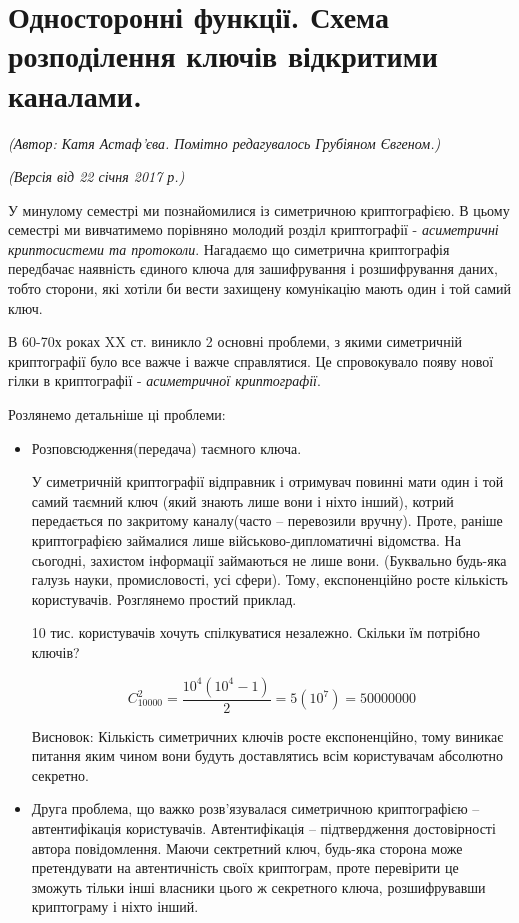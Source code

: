 \section{Односторонні функції. Схема розподілення ключів відкритими каналами.}
\begin{flushright}
\emph{(Автор: Катя Астаф'єва. Помітно редагувалось Грубіяном Євгеном.)}
\par \emph{(Версія від 22 січня 2017 р.)}
\end{flushright}

У минулому семестрі ми познайомилися із симетричною криптографією. В цьому семестрі ми вивчатимемо порівняно молодий розділ криптографії - \textit{асиметричні криптосистеми та протоколи}. Нагадаємо що симетрична криптографія передбачає наявність єдиного ключа для зашифрування і розшифрування даних, тобто сторони, які хотіли би вести захищену комунікацію мають один і той самий ключ.

В 60-70х роках XX ст. виникло 2 основні проблеми, з якими симетричній криптографії було все важче і важче справлятися. Це спровокувало появу нової гілки в криптографії - \textit{асиметричної криптографії}. 

Розлянемо детальніше ці проблеми:
\begin{itemize}
\item Розповсюдження(передача) таємного ключа.

У симетричній криптографії відправник і отримувач повинні мати один і той самий таємний ключ (який знають лише вони і ніхто інший), котрий передається по закритому каналу(часто -- перевозили вручну). Проте, раніше криптографією займалися лише військово-дипломатичні відомства. На сьогодні, захистом інформації займаються не лише вони. (Буквально будь-яка галузь науки, промисловості, усі сфери). Тому, експоненційно росте кількість користувачів. Розглянемо простий приклад.

\begin{example}
10 тис. користувачів хочуть спілкуватися незалежно. Скільки їм потрібно ключів?

\[ C_{10000}^{2} =\frac{10^4(10^4 -1)}{2} = 5(10^7) = 50000000 \]

Висновок: Кількість симетричних ключів росте експоненційно, тому виникає питання яким чином вони будуть доставлятись всім користувачам абсолютно секретно.

\end{example}

\item Друга проблема, що важко розв’язувалася симетричною криптографією – автентифікація користувачів. Автентифікація – підтвердження достовірності автора повідомлення. Маючи сектретний ключ, будь-яка сторона може претендувати на автентичність своїх криптограм, проте перевірити це зможуть тільки інші власники цього ж секретного ключа, розшифрувавши криптограму і ніхто інший.

\end{itemize}

